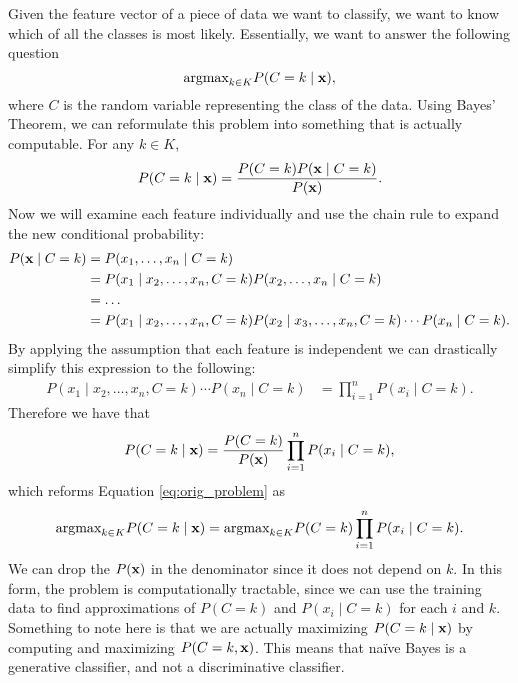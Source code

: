 Given the feature vector of a piece of data we want to classify, we want to know which of all the classes is most likely. Essentially, we want to answer the following question
\begin{equation}\label{eq:orig_problem}
    \mbox{argmax}_{k\in K} P(C=k \mid \mathbf{x}),
\end{equation}
where $C$ is the random variable representing the class of the data.
Using Bayes' Theorem, we can reformulate this problem into something that is actually computable. For any $k\in K$,
\begin{align*}
    P(C=k \mid \mathbf{x}) = \frac{P(C=k)P(\mathbf{x} \mid C=k)}{P(\mathbf{x})}.
\end{align*}
Now we will examine each feature individually and use the chain rule to expand the new conditional probability:
\begin{align*}
    P(\mathbf{x} \mid C=k) &= P(x_1,\dots,x_n \mid C=k) \\
    &= P(x_1 \mid x_2,\dots,x_n,C=k)P(x_2,\dots,x_n \mid C=k) \\
    &= \dots \\
    &= P(x_1 \mid x_2,\dots,x_n,C=k)P(x_2 \mid x_3, \dots, x_n,C=k)\cdots P(x_n \mid C=k).
\end{align*}
By applying the assumption that each feature is independent we can drastically simplify this expression to the following:
\begin{align*}
    P(x_1 \mid x_2,\dots,x_n,C=k)\cdots P(x_n \mid C=k) &= \prod_{i=1}^{n}P(x_i \mid C=k).
\end{align*}
Therefore we have that
\begin{align*}
    P(C=k \mid \mathbf{x}) = \frac{P(C=k)}{P(\mathbf{x})} \prod_{i=1}^{n}P(x_i \mid C=k),
\end{align*}
which reforms Equation \ref{eq:orig_problem} as
\begin{equation}\label{eq:simple_problem}
    \mbox{argmax}_{k\in K} P(C=k \mid \mathbf{x}) = \mbox{argmax}_{k\in K} P(C=k)\prod_{i=1}^{n}P(x_i \mid C=k).
\end{equation}
We can drop the $P(\mathbf{x})$ in the denominator since it does not depend on $k$.
In this form, the problem is computationally tractable,
since we can use the training data to find approximations of $P(C=k)$ and $P(x_i \mid C=k)$ for each $i$ and $k$.
Something to note here is that we are actually maximizing $P(C=k \mid \mathbf{x})$ by computing and maximizing $P(C=k,\mathbf{x})$.
This means that naïve Bayes is a generative classifier, and not a discriminative classifier.

